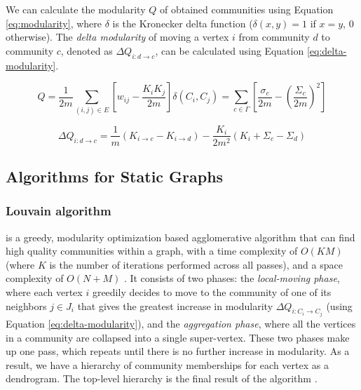 We can calculate the modularity $Q$ of obtained communities using Equation \ref{eq:modularity}, where $\delta$ is the Kronecker delta function ($\delta (x,y)=1$ if $x=y$, $0$ otherwise). The \textit{delta modularity} of moving a vertex $i$ from community $d$ to community $c$, denoted as $\Delta Q_{i: d \rightarrow c}$, can be calculated using Equation \ref{eq:delta-modularity}.

\begin{equation}
\label{eq:modularity}
  Q
  = \frac{1}{2m} \sum_{(i, j) \in E} \left[w_{ij} - \frac{K_i K_j}{2m}\right] \delta(C_i, C_j)
  = \sum_{c \in \Gamma} \left[\frac{\sigma_c}{2m} - \left(\frac{\Sigma_c}{2m}\right)^2\right]
\end{equation}

\begin{equation}
\label{eq:delta-modularity}
  \Delta Q_{i: d \rightarrow c}
  = \frac{1}{m} (K_{i \rightarrow c} - K_{i \rightarrow d}) - \frac{K_i}{2m^2} (K_i + \Sigma_c - \Sigma_d)
\end{equation}




\subsection{Algorithms for Static Graphs}

\subsubsection{Louvain algorithm \cite{com-blondel08}}
\label{sec:about-louvain}

\Lou{} is a greedy, modularity optimization based agglomerative algorithm that can find high quality communities within a graph, with a time complexity of $O (KM)$ (where $K$ is the number of iterations performed across all passes), and a space complexity of $O(N + M)$ \cite{com-lancichinetti09}. It consists of two phases: the \textit{local-moving phase}, where each vertex $i$ greedily decides to move to the community of one of its neighbors $j \in J_i$ that gives the greatest increase in modularity $\Delta Q_{i:C_i \rightarrow C_j}$ (using Equation \ref{eq:delta-modularity}), and the \textit{aggregation phase}, where all the vertices in a community are collapsed into a single super-vertex. These two phases make up one pass, which repeats until there is no further increase in modularity. As a result, we have a hierarchy of community memberships for each vertex as a dendrogram. The top-level hierarchy is the final result of the algorithm \cite{com-leskovec21}.



